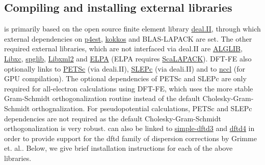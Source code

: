 \subsection{Compiling and installing external libraries}
\dftfe{} is primarily based on the open source finite element library \href{http://www.dealii.org/}{deal.II}, through which external dependencies
on \href{http://p4est.org/}{p4est}, \href{https://github.com/kokkos/kokkos}{kokkos} and BLAS-LAPACK are set. The other required external libraries, which are
not interfaced via deal.II are \href{http://www.alglib.net/}{ALGLIB}, \href{http://www.tddft.org/programs/libxc/}{Libxc}, \href{https://atztogo.github.io/spglib/}{spglib}, \href{http://www.xmlsoft.org/}{Libxml2} and \href{https://elpa.mpcdf.mpg.de/}{ELPA} (ELPA requires \href{http://www.netlib.org/scalapack/}{ScaLAPACK}). DFT-FE also optionally links to \href{https://www.mcs.anl.gov/petsc/}{PETSc} (via deali.II), \href{http://slepc.upv.es/}{SLEPc} (via deali.II) and to \href{https://developer.nvidia.com/nccl}{nccl} (for GPU compilation). The optional dependencies of PETSc and SLEPc are only required for all-electron calculations using DFT-FE, which uses the more stable Gram-Schmidt orthogonalization routine instead of the default Cholesky-Gram-Schmidt orthognalization. For pseudopotential calculations, PETSc and SLEPc dependencies are not required as the default Cholesky-Gram-Schmidt orthogonalization is very robust. \dftfe{} can also be linked to \href{https://github.com/awvwgk/simple-dftd3}{simple-dftd3} and \href{https://github.com/dftd4/dftd4}{dftd4} in order to provide support for the dftd family of dispersion corrections by Grimme et. al.. Below, we give brief installation instructions for each of the above libraries.
